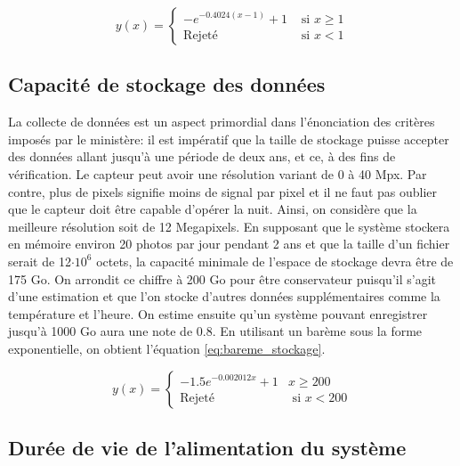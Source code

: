 \begin{equation}
y(x) = \begin{cases}
        -e^{-0.4024(x-1)}+1 & \text{ si } x \geq 1\\
        \text{Rejeté} & \text{ si } x < 1
    \end{cases}
    \label{eq:bareme_volume_analyse}
\end{equation}


\subsection{Capacité de stockage des données}
\label{subsection:capacite_stockage}

La collecte de données est un aspect primordial dans l'énonciation des critères imposés par le ministère: il est impératif que la taille de stockage puisse accepter des données allant jusqu'à une période de deux ans, et ce, à des fins de vérification. Le capteur peut avoir une résolution variant de 0 à 40 Mpx. Par contre, plus de pixels signifie moins de signal par pixel et il ne faut pas oublier que le capteur doit être capable d'opérer la nuit. Ainsi, on considère que la meilleure résolution soit de 12 Megapixels. En supposant que le système stockera en mémoire environ 20 photos par jour pendant 2 ans et que la taille d'un fichier serait de 12$\cdot 10^6$ octets, la capacité minimale de l'espace de stockage devra être de 175 Go. On arrondit ce chiffre à 200 Go pour être conservateur puisqu'il s'agit d'une estimation et que l'on stocke d'autres données supplémentaires comme la température et l'heure. On estime ensuite qu'un système pouvant enregistrer jusqu'à 1000 Go aura une note de 0.8. En utilisant un barème sous la forme exponentielle, on obtient l'équation \ref{eq:bareme_stockage}.

\begin{equation}
    y(x) = \begin{cases}
        -1.5e^{-0.002012x} + 1 & x \geq 200  \\      \text{Rejeté} & \text{ si } x < 200
    \end{cases}
    \label{eq:bareme_stockage}
\end{equation}


\subsection{Durée de vie de l'alimentation du système}
\label{subsection:dureeviealim}

